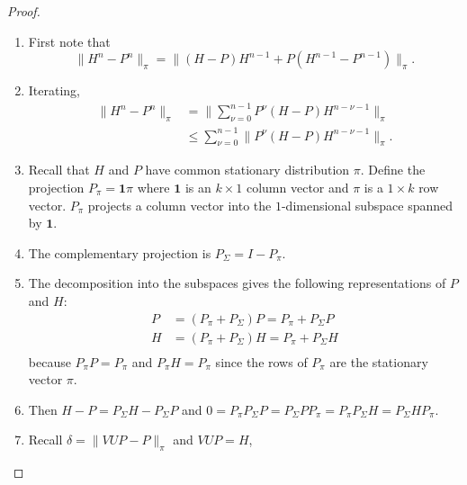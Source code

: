\documentclass[12pt]{article}
\begin{document}
\begin{proof}
    \begin{enumerate}
        \item
            First note that
            \[
                \| H^n - P^n \|_{\pi} = \|(H-P)H^{n-1}+P(H^{n-1} -P^{n-1})\|_
                {\pi}.
            \]
        \item
            Iterating,
            \begin{align*}
                \| H^n - P^n \|_{\pi} &= \| \sum_{\nu=0}^{n-1} P^\nu(H-P)H^
                {n-\nu-1}\|_{\pi} \\
                & \le \sum_{\nu=0}^{n-1} \| P^\nu(H-P)H^{n-\nu-1}\|_{\pi}.
            \end{align*}
        \item
            Recall that \( H \) and \( P \) have common stationary
            distribution \( \pi \).  Define the projection \( P_{\pi} =
            \mathbf{1} \pi \) where \( \mathbf{1} \) is an \( k \times 1
            \) column vector and \( \pi \) is a \( 1 \times k \) row
            vector.  \( P_{\pi} \) projects a column vector into the \(
            1 \)-dimensional subspace spanned by \( \mathbf{1} \).
        \item
            The complementary projection is \( P_{\Sigma} = I - P_{\pi} \).
        \item
            The decomposition into the subspaces gives the following
            representations of \( P \) and \( H \):
            \begin{align*}
                P &= (P_{\pi} + P_{\Sigma}) P = P_{\pi} + P_{\Sigma}P \\
                H &= (P_{\pi} + P_{\Sigma}) H = P_{\pi} + P_{\Sigma}H \\
            \end{align*}
            because \( P_{\pi}P = P_{\pi} \) and \( P_{\pi}H = P_{\pi} \)
            since the rows of \( P_{\pi} \) are the stationary vector \(
            \pi \).
        \item
            Then \( H - P = P_{\Sigma}H - P_{\Sigma}P \) and \( 0 = P_{\pi}
            P_{\Sigma} P = P_{\Sigma} P P_{\pi} = P_{\pi} P_{\Sigma} H =
            P_{\Sigma} H P_{\pi} \).
        \item
            Recall \( \delta = \| VUP - P \|_{\pi} \) and \( VUP = H \),

\end{enumerate}
\end{proof}
\end{document}

